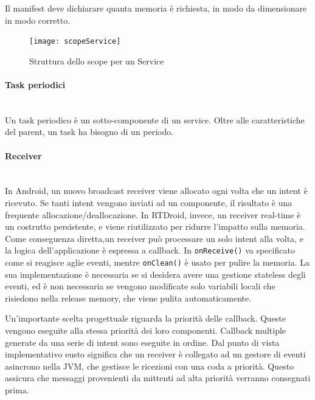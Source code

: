 Il manifest deve dichiarare quanta memoria è richiesta, in modo da dimensionare in modo corretto.
\begin{figure}[h]
	\centering
	\texttt{[image: scopeService]}
	\caption{Struttura dello scope per un Service}
	\label{fig:scopeservice}
\end{figure}

\paragraph{Task periodici}\mbox{} \\
Un task periodico è un sotto-componente di un service. Oltre alle caratteristiche del parent, un task ha bisogno di un periodo.

\paragraph{Receiver}\mbox{} \\
In Android, un nuovo broadcast receiver viene allocato ogni volta che un intent è ricevuto. Se tanti intent vengono inviati ad un componente, il risultato è una frequente allocazione/deallocazione. In RTDroid, invece, un receiver real-time è un costrutto persistente, e viene riutilizzato per ridurre l'impatto sulla memoria. Come conseguenza diretta,un receiver può processare un solo intent alla volta, e la logica dell'applicazione è espressa a callback. In \texttt{onReceive()} va specificato come si reagisce aglie eventi, mentre \texttt{onClean()} è usato per pulire la memoria. La sua implementazione è necessaria se si desidera avere una gestione stateless degli eventi, ed è non necessaria se vengono modificate solo variabili locali che risiedono nella release memory, che viene pulita automaticamente.

Un'importante scelta progettuale riguarda la priorità delle callback. Queste vengono eseguite alla stessa priorità dei loro componenti. Callback multiple generate da una serie di intent sono eseguite in ordine. Dal punto di vista implementativo eusto significa che un receiver è collegato ad un gestore di eventi asincrono nella JVM, che gestisce le ricezioni con una coda a priorità. Questo assicura che messaggi provenienti da mittenti ad alta priorità verranno consegnati prima. 


